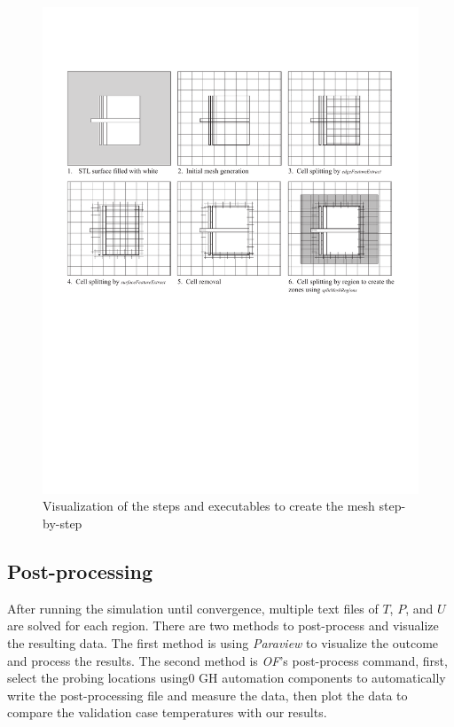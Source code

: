 \begin{figure}[htb]
     \centering
    \includegraphics[trim=1cm 11cm 1cm 3cm, clip, width=1\linewidth]{Figures/snappyhex.pdf}
     \caption[Mesh Creation Steps]{Visualization of the steps and executables to create the mesh step-by-step}
   \label{meshsteps}
 \end{figure}


\subsection{Post-processing}
After running the simulation until convergence, multiple text files of $T$, $P$, and $U$ are solved for each region. There are two methods to post-process and visualize the resulting data. The first method is using \textit{Paraview} to visualize the outcome and process the results. The second method is \textit{\gls{OF}}'s post-process command, first, select the probing locations using0 \gls{GH} automation components to automatically write the post-processing file and measure the data, then plot the data to compare the validation case temperatures with our results. 



